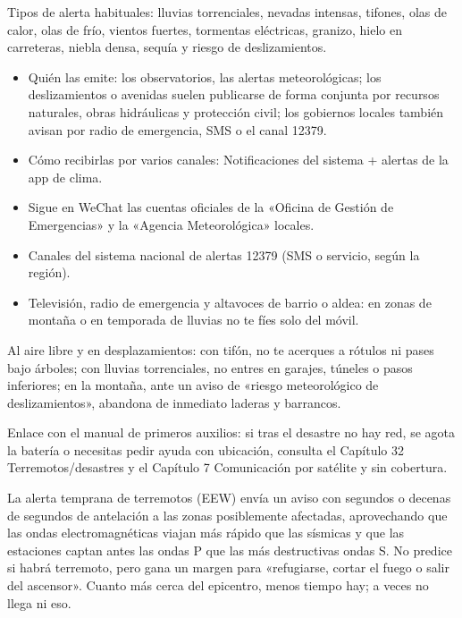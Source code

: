 Tipos de alerta habituales: lluvias torrenciales, nevadas intensas, tifones, olas de calor, olas de frío, vientos fuertes, tormentas eléctricas, granizo, hielo en carreteras, niebla densa, sequía y riesgo de deslizamientos.


\begin{itemize}
  \item Quién las emite: los observatorios, las alertas meteorológicas; los deslizamientos o avenidas suelen publicarse de forma conjunta por recursos naturales, obras hidráulicas y protección civil; los gobiernos locales también avisan por radio de emergencia, SMS o el canal 12379.
  \item Cómo recibirlas por varios canales: Notificaciones del sistema + alertas de la app de clima.
  \item Sigue en WeChat las cuentas oficiales de la «Oficina de Gestión de Emergencias» y la «Agencia Meteorológica» locales.
  \item Canales del sistema nacional de alertas 12379 (SMS o servicio, según la región).
  \item Televisión, radio de emergencia y altavoces de barrio o aldea: en zonas de montaña o en temporada de lluvias no te fíes solo del móvil.
\end{itemize}

Al aire libre y en desplazamientos: con tifón, no te acerques a rótulos ni pases bajo árboles; con lluvias torrenciales, no entres en garajes, túneles o pasos inferiores; en la montaña, ante un aviso de «riesgo meteorológico de deslizamientos», abandona de inmediato laderas y barrancos.

Enlace con el manual de primeros auxilios: si tras el desastre no hay red, se agota la batería o necesitas pedir ayuda con ubicación, consulta el Capítulo 32 Terremotos/desastres y el Capítulo 7 Comunicación por satélite y sin cobertura.


La alerta temprana de terremotos (EEW) envía un aviso con segundos o decenas de segundos de antelación a las zonas posiblemente afectadas, aprovechando que las ondas electromagnéticas viajan más rápido que las sísmicas y que las estaciones captan antes las ondas P que las más destructivas ondas S. No predice si habrá terremoto, pero gana un margen para «refugiarse, cortar el fuego o salir del ascensor». Cuanto más cerca del epicentro, menos tiempo hay; a veces no llega ni eso.

